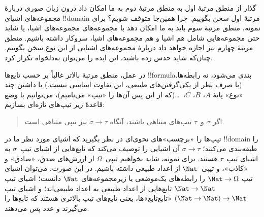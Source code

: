 \documentclass[../../../include/open-logic-section]{subfiles}
\begin{document}


گذار از منطق مرتبهٔ اول به منطق مرتبهٔ دوم به ما امکان داد درون زبان
صوری دربارهٔ مجموعه‌های اشیای !!{domain} مرتبهٔ اول سخن بگوییم. چرا
همین‌جا متوقف شویم؟ برای نمونه، منطق مرتبهٔ سوم باید به ما امکان دهد با
مجموعه‌های مجموعه‌های اشیا، یا شاید حتی مجموعه‌هایی شامل هم اشیا و هم
مجموعه‌های اشیا، سروکار داشته باشیم. منطق مرتبهٔ چهارم نیز اجازه خواهد
داد دربارهٔ مجموعه‌های اشیایی از این نوع سخن بگوییم. چنان‌که شاید حدس
زده باشید، این ایده را می‌توان به‌دلخواه تکرار کرد.

در عمل، منطق مرتبهٔ بالاتر غالباً بر حسب تابع‌ها !!{formula}‌بندی
می‌شود، نه رابطه‌ها. (با صرف نظر از یکی‌گرفتن‌های طبیعی، این تفاوت
اساسی نیست.) با داشتن چند «نوع» پایهٔ $A$، $B$، $C$،~\dots (که از این
پس آن‌ها را «تیپ» می‌نامیم)، می‌توانیم با وضع قاعدهٔ زیر تیپ‌های تازه‌ای
بسازیم:
\begin{quote}
اگر $\sigma$ و~$\tau$ تیپ‌های متناهی باشند، آنگاه $\sigma \to \tau$
نیز تیپی متناهی است.
\end{quote}
تیپ‌ها را «برچسب»های نحوی‌ای در نظر بگیرید که اشیای مورد نظر ما در
!!{domain} را طبقه‌بندی می‌کنند؛ $\sigma \to \tau$ آن اشیایی را توصیف
می‌کند که تابع‌هایی از اشیای تیپ~$\sigma$ به اشیای تیپ~$\tau$ هستند.
برای نمونه، شاید بخواهیم تیپی~$\Omega$ از ارزش‌های صدق، «صادق» و
«کاذب»، و تیپی~$\Nat$ از اعداد طبیعی داشته باشیم. در این صورت، می‌توان
اشیای تیپ $\Nat \to \Omega$ را رابطه‌های یک‌موضعی یا زیرمجموعه‌های
$\Nat$ دانست؛ اشیای تیپ $\Nat \to \Nat$ تابع‌هایی از اعداد طبیعی به
اعداد طبیعی‌اند؛ و اشیای تیپ $(\Nat \to \Nat) \to \Nat$ «تابع‌تابع»ها،
یعنی تابع‌های تیپ بالاتری هستند که تابع‌ها را می‌گیرند و عدد پس می‌دهند.
\end{document}
